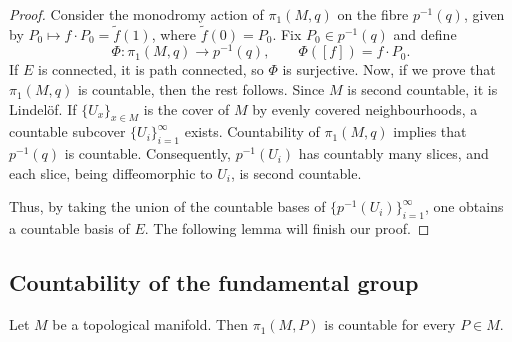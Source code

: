 \documentclass[11pt,a4paper]{article}
\begin{document}
\begin{proof}
Consider the monodromy action of $\pi_1(M,q)$ on the fibre $p^{-1}(q)$, given by $P_0\mapsto f\cdot P_0=\widetilde f(1)$, where $\widetilde f(0)=P_0$. Fix $P_0\in p^{-1}(q)$ and define
\[
 \Phi:\pi_1(M,q)\longrightarrow p^{-1}(q),
 \qquad \Phi([f])=f\cdot P_0.
\]
If $E$ is connected, it is path connected, so $\Phi$ is surjective. Now, if we prove that $\pi_1(M,q)$ is countable, then the rest follows. Since $M$ is second countable, it is Lindel\"of. If $\{U_x\}_{x\in M}$ is the cover of $M$ by evenly covered neighbourhoods, a countable subcover $\{U_i\}_{i=1}^{\infty}$ exists. Countability of $\pi_1(M,q)$ implies that $p^{-1}(q)$ is countable. Consequently, $p^{-1}(U_i)$ has countably many slices, and each slice, being diffeomorphic to $U_i$, is second countable.

Thus, by taking the union of the countable bases of $\{p^{-1}(U_i)\}_{i=1}^{\infty}$, one obtains a countable basis of $E$. The following lemma will finish our proof.
\end{proof}

\subsection{Countability of the fundamental group}
\setcounter{theorem}{1}\begin{lemma}\label{lem:countable-fundamental}
Let $M$ be a topological manifold. Then $\pi_1(M,P)$ is countable for every $P\in M$.
\end{lemma}
\end{document}
